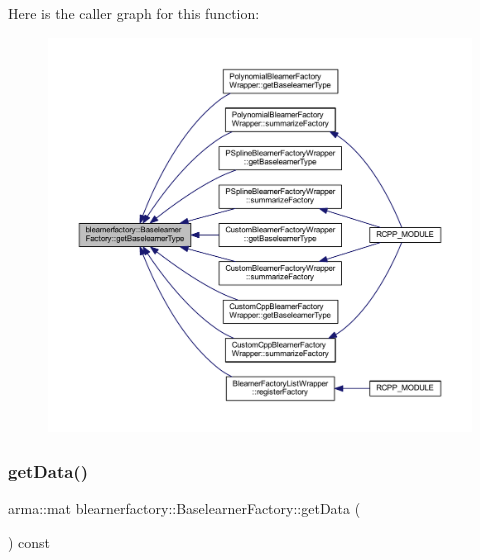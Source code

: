 Here is the caller graph for this function\+:\nopagebreak
\begin{figure}[H]
\begin{center}
\leavevmode
\includegraphics[width=350pt]{classblearnerfactory_1_1_baselearner_factory_a05d5c00f7a434548868c4ad21d0f5fda_icgraph}
\end{center}
\end{figure}
\mbox{\label{classblearnerfactory_1_1_baselearner_factory_ad9da09739f04e5c8bd268551251801be}} 
\subsubsection{\texorpdfstring{get\+Data()}{getData()}}
{\footnotesize\ttfamily arma\+::mat blearnerfactory\+::\+Baselearner\+Factory\+::get\+Data (\begin{DoxyParamCaption}{ }\end{DoxyParamCaption}) const}

